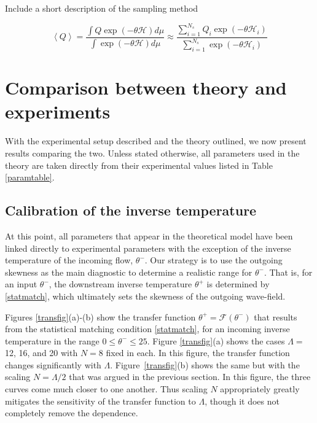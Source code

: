 \documentclass[11pt]{article}
\newcommand{\nick}[1]{{\color{red} #1}}
\newcommand{\mean}[1]{\left< #1 \right>}
\newcommand{\eps}{\varepsilon}
\newcommand{\lamfac}{N}
\newcommand{\drat}{\mathcal{D}}
\newcommand{\dratdn}{\drat_+}
\newcommand{\epsup}{\eps_0}
\newcommand{\delup}{\delta_0}
\newcommand{\Ham}{\mathcal{H}}
\newcommand{\thup}{\theta^{-}}
\newcommand{\thdn}{\theta^{+}}
\newcommand{\transf}{\mathcal{F}}
\newcommand{\Nsamp}{N_s}
\newcommand{\sumsamp}{\sum_{i=1}^{\Nsamp}}
\begin{document}
\nick{Include a short description of the sampling method}

\begin{equation}
\mean{Q} = \frac{\int Q \exp\left(-\theta \Ham \right) d\mu}{ \int \exp\left(-\theta \Ham \right) d\mu}
\approx \frac{\sumsamp Q_i \exp(-\theta \Ham_i)} {\sumsamp \exp(-\theta \Ham_i)}
\end{equation}


\section{Comparison between theory and experiments}

With the experimental setup described and the theory outlined, we now present results comparing the two. Unless stated otherwise, all parameters used in the theory are taken directly from their experimental values listed in Table \ref{paramtable}. 

\subsection{Calibration of the inverse temperature}

At this point, all parameters that appear in the theoretical model have been linked directly to experimental parameters with the exception of the inverse temperature of the incoming flow, $\thup$.
Our strategy is to use the outgoing skewness as the main diagnostic to determine a realistic range for $\thup$. That is, for an input $\thup$, the downstream inverse temperature $\thdn$ is determined by \eqref{statmatch}, which ultimately sets the skewness of the outgoing wave-field.

	Figures \ref{transfig}(a)-(b) show the transfer function $\thdn = \transf(\thup)$ that results from the statistical matching condition \eqref{statmatch}, for an incoming inverse temperature in the range $0 \le \thup \le 25$. Figure \ref{transfig}(a) shows the cases $\Lambda = $ 12, 16, and 20 with $\lamfac = 8$ fixed in each. In this figure, the transfer function changes significantly with $\Lambda$. Figure~\ref{transfig}(b) shows the same but with the scaling $\lamfac = \Lambda/2$ that was argued in the previous section. In this figure, the three curves come much closer to one another. Thus scaling $\lamfac$ appropriately greatly mitigates the sensitivity of the transfer function to $\Lambda$, though it does not completely remove the dependence.
\end{document}
